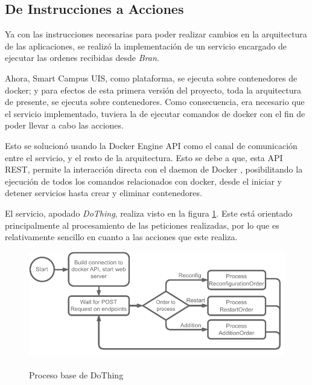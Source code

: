 \subsection{De Instrucciones a Acciones}




Ya con las instrucciones necesarias para poder realizar cambios en la arquitectura de las aplicaciones, se realizó la implementación de un servicio encargado de ejecutar las ordenes recibidas desde \textit{Bran}.

Ahora, Smart Campus UIS, como plataforma, se ejecuta sobre contenedores de docker; y para efectos de esta primera versión del proyecto, toda la arquitectura de presente, se ejecuta sobre contenedores. Como consecuencia, era necesario que el servicio implementado, tuviera la de ejecutar comandos de docker con el fin de poder llevar a cabo las acciones.

Esto se solucionó usando la Docker Engine API como el canal de comunicación entre el servicio, y el resto de la arquitectura. Esto se debe a que, esta API REST, permite la interacción directa con el daemon de Docker \cite{docker}, posibilitando la ejecución de todos los comandos relacionados con docker, desde el iniciar y detener servicios hasta crear y eliminar contenedores.

El servicio, apodado \textit{DoThing}, realiza visto en la figura \ref{fig:DoThing}. Este está orientado principalmente al procesamiento de las peticiones realizadas, por lo que es relativamente sencillo en cuanto a las acciones que este realiza. 

\begin{figure}[ht]
    \centering
    \caption{\\Proceso base de DoThing}
    \label{fig:DoThing}
    \includegraphics[width=0.75\linewidth]{images/DoThingProcess.pdf}
\end{figure}

